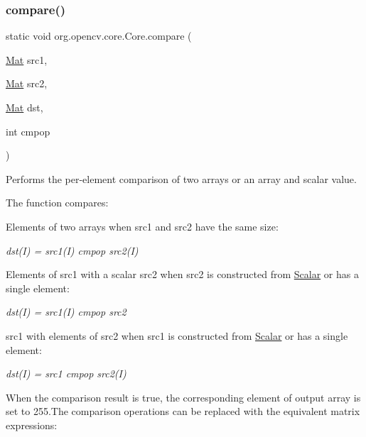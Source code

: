 \subsubsection{\texorpdfstring{compare()}{compare()}\hspace{0.1cm}{\footnotesize\ttfamily [1/2]}}
{\footnotesize\ttfamily static void org.\+opencv.\+core.\+Core.\+compare (\begin{DoxyParamCaption}\item[{\mbox{\hyperlink{classorg_1_1opencv_1_1core_1_1_mat}{Mat}}}]{src1,  }\item[{\mbox{\hyperlink{classorg_1_1opencv_1_1core_1_1_mat}{Mat}}}]{src2,  }\item[{\mbox{\hyperlink{classorg_1_1opencv_1_1core_1_1_mat}{Mat}}}]{dst,  }\item[{int}]{cmpop }\end{DoxyParamCaption})\hspace{0.3cm}{\ttfamily [static]}}

Performs the per-\/element comparison of two arrays or an array and scalar value.

The function compares\+:


\begin{DoxyItemize}
\item Elements of two arrays when {\ttfamily src1} and {\ttfamily src2} have the same size\+: 
\end{DoxyItemize}

{\itshape dst(\+I) = src1(\+I) cmpop src2(\+I)}


\begin{DoxyItemize}
\item Elements of {\ttfamily src1} with a scalar {\ttfamily src2} when {\ttfamily src2} is constructed from {\ttfamily \mbox{\hyperlink{classorg_1_1opencv_1_1core_1_1_scalar}{Scalar}}} or has a single element\+: 
\end{DoxyItemize}

{\itshape dst(\+I) = src1(\+I) cmpop src2}


\begin{DoxyItemize}
\item {\ttfamily src1} with elements of {\ttfamily src2} when {\ttfamily src1} is constructed from {\ttfamily \mbox{\hyperlink{classorg_1_1opencv_1_1core_1_1_scalar}{Scalar}}} or has a single element\+: 
\end{DoxyItemize}

{\itshape dst(\+I) = src1 cmpop src2(\+I)}

When the comparison result is true, the corresponding element of output array is set to 255.\+The comparison operations can be replaced with the equivalent matrix expressions\+: {\ttfamily }

